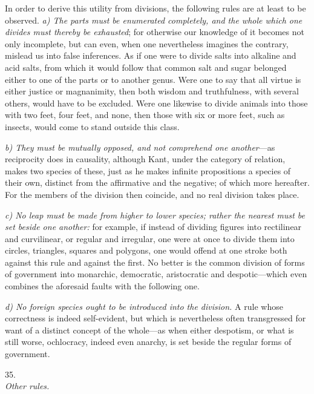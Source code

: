 \documentclass[12pt,a4paper]{article}
\newcommand{\logsec}[2]{%
  \bigskip\begin{center}{\large #1}\\[4pt]{\emph{#2}}\end{center}\smallskip}
\begin{document}
\noindent
In order to derive this utility from divisions, the following rules are at least
to be observed. \emph{a) The parts must be enumerated completely, and the whole
which one divides must thereby be exhausted}; for otherwise our knowledge of it
becomes not only incomplete, but can even, when one nevertheless imagines the
contrary, mislead us into false inferences. As if one were to divide salts into
alkaline and acid salts, from which it would follow that common salt and sugar
belonged either to one of the parts or to another genus. Were one to say that
all virtue is either justice or magnanimity, then both wisdom and truthfulness,
with several others, would have to be excluded. Were one likewise to divide
animals into those with two feet, four feet, and none, then those with six or
more feet, such as insects, would come to stand outside this class.

\emph{b) They must be mutually opposed, and not comprehend one another}---as
reciprocity does in causality, although Kant, under the category of relation,
makes two species of these, just as he makes infinite propositions a species of
their own, distinct from the affirmative and the negative; of which more
hereafter. For the members of the division then coincide, and no real division
takes place.

\emph{c) No leap must be made from higher to lower species; rather the nearest
must be set
beside one another:} for example, if instead of dividing figures into
rectilinear and curvilinear, or regular and irregular, one were at once to
divide them into circles, triangles, squares and polygons, one would offend at
one stroke both against this rule and against the first. No better is the common
division of forms of government into monarchic, democratic, aristocratic and
despotic---which even combines the aforesaid faults with the following one.

\emph{d) No foreign species ought to be introduced into the division.} A rule
whose correctness is indeed self-evident, but which is nevertheless often
transgressed for want of a distinct concept of the whole---as when either
despotism, or what is still worse, ochlocracy, indeed even anarchy, is set
beside the regular forms of government.

\logsec{35.}{Other rules.}
\end{document}
